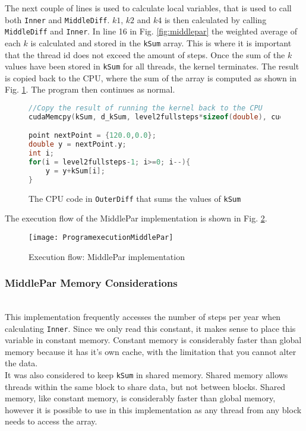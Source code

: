 The next couple of lines is used to calculate local variables, that is used to call both \texttt{Inner} and \texttt{MiddleDiff}. $k1$, $k2$ and $k4$ is then calculated by calling \texttt{MiddleDiff} and \texttt{Inner}. In line 16 in Fig. \ref{fig:middlepar} the weighted average of each $k$ is calculated and stored in the \texttt{kSum} array. This is where it is important that the thread id does not exceed the amount of steps. Once the sum of the $k$ values have been stored in \texttt{kSum} for all threads, the kernel terminates. The result is copied back to the CPU, where the sum of the array is computed as shown in Fig. \ref{fig:middleparcpu}. The program then continues as normal.

\begin{figure}[ht!]
\begin{lstlisting}[language=c]
//Copy the result of running the kernel back to the CPU
cudaMemcpy(kSum, d_kSum, level2fullsteps*sizeof(double), cudaMemcpyDeviceToHost);

point nextPoint = {120.0,0.0};
double y = nextPoint.y;
int i;
for(i = level2fullsteps-1; i>=0; i--){
	y = y+kSum[i];
}
\end{lstlisting}
\caption{The CPU code in \texttt{OuterDiff} that sums the values of \texttt{kSum}}
\label{fig:middleparcpu}
\end{figure}

The execution flow of the MiddlePar implementation is shown in Fig. \ref{fig:middleparexec}.

\begin{figure}[ht!]
  \centering
    \texttt{[image: ProgramexecutionMiddlePar]}
  \caption{Execution flow: MiddlePar implementation}
  \label{fig:middleparexec}
\end{figure}

\subsubsection{MiddlePar Memory Considerations} \hfill \\
This implementation frequently accesses the number of steps per year when calculating \texttt{Inner}. Since we only read this constant, it makes sense to place this variable in constant memory. Constant memory is considerably faster than global memory\cite{bpg} because it has it's own cache, with the limitation that you cannot alter the data.\\

It was also considered to keep \texttt{kSum} in shared memory. Shared memory allows threads within the same block to share data, but not between blocks. Shared memory, like constant memory, is considerably faster than global memory, however it is possible to use in this implementation as any thread from any block needs to access the array.


